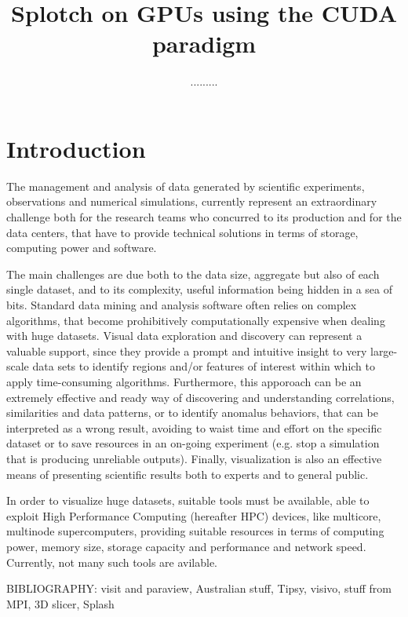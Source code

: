 \documentclass[11pt]{article}
\title{Splotch on GPUs using the CUDA paradigm}
\author{.........}
\begin{document}
\maketitle

\section{Introduction}

The management and analysis of data generated by scientific experiments, 
observations and numerical simulations, currently represent an extraordinary challenge  
both for the research teams who concurred to its production and for 
the data centers, that have to provide technical solutions in terms of 
storage, computing power and software.

The main challenges are due both to the data size, aggregate but also of each 
single dataset, and to its complexity, useful information being hidden in a sea 
of bits. Standard data mining and analysis software often relies on complex
algorithms, that become prohibitively computationally expensive when dealing with 
huge datasets. Visual data exploration and discovery can represent a valuable
support, since they provide a prompt and intuitive insight to
very large-scale data sets to identify regions and/or features of interest within which
to apply time-consuming algorithms. 
Furthermore, this apporoach can be an extremely effective and ready way of discovering 
and understanding correlations,
similarities and data patterns, or to identify anomalus behaviors, that can be
interpreted as a wrong result, avoiding to waist time and effort on the specific dataset or
to save resources in an on-going experiment (e.g. stop a simulation that is producing 
unreliable outputs). Finally, visualization is also an effective means of presenting
scientific results both to experts and to general public.

In order to visualize huge datasets, suitable tools must be available, able to 
exploit High Performance Computing (hereafter HPC) devices, like multicore, multinode
supercomputers, providing suitable resources in terms of computing power, memory size, 
storage capacity and performance and network speed. Currently, not many such tools are avilable.

BIBLIOGRAPHY: visit and paraview, Australian stuff, Tipsy, visivo, stuff from MPI, 3D slicer, Splash
\end{document}

